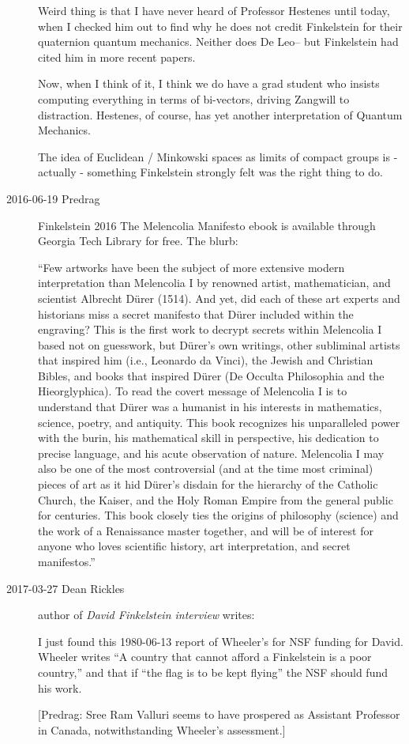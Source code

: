 \begin{description}
Weird thing is that I have never heard of Professor Hestenes until
today, when I checked him out to find why he does not credit
Finkelstein \etal{} for their quaternion quantum
mechanics. Neither does De Leo-- but Finkelstein had cited
him in more recent papers.

Now, when I think of it, I think we do have a grad student who insists
computing everything in terms of bi-vectors, driving Zangwill to
distraction. Hestenes, of course, has yet another interpretation of
Quantum Mechanics.

The idea of Euclidean / Minkowski spaces as limits of compact groups is
- actually - something Finkelstein strongly felt was the right thing to
do.

\item[2016-06-19 Predrag]
Finkelstein 2016
{{The Melencolia Manifesto}} ebook is available through Georgia Tech Library
for free. The blurb:

``Few artworks have been the subject of more extensive modern
interpretation than Melencolia I by renowned artist, mathematician, and
scientist Albrecht Dürer (1514). And yet, did each of these art experts
and historians miss a secret manifesto that Dürer included within the
engraving? This is the first work to decrypt secrets within Melencolia I
based not on guesswork, but D\"urer's own writings, other subliminal
artists that inspired him (i.e., Leonardo da Vinci), the Jewish and
Christian Bibles, and books that inspired D\"urer (De Occulta Philosophia
and the Hieorglyphica). To read the covert message of Melencolia I is to
understand that D\"urer was a humanist in his interests in mathematics,
science, poetry, and antiquity. This book recognizes his unparalleled
power with the burin, his mathematical skill in perspective, his
dedication to precise language, and his acute observation of nature.
Melencolia I may also be one of the most controversial (and at the time
most criminal) pieces of art as it hid D\"urer's disdain for the hierarchy
of the Catholic Church, the Kaiser, and the Holy Roman Empire from the
general public for centuries. This book closely ties the origins of
philosophy (science) and the work of a Renaissance master together, and
will be of interest for anyone who loves scientific history, art
interpretation, and secret manifestos.''

\item[2017-03-27 Dean Rickles]
author of {\em {David Finkelstein} interview} writes:

I just found
{this 1980-06-13 report} of Wheeler's for NSF funding for David. Wheeler
writes ``A country that cannot afford a Finkelstein is a poor country,''
and that if ``the flag is to be kept flying'' the NSF should fund his
work.

[Predrag: 
{Sree Ram Valluri} seems to have prospered as Assistant Professor in
Canada, notwithstanding Wheeler's assessment.]




\end{description}

